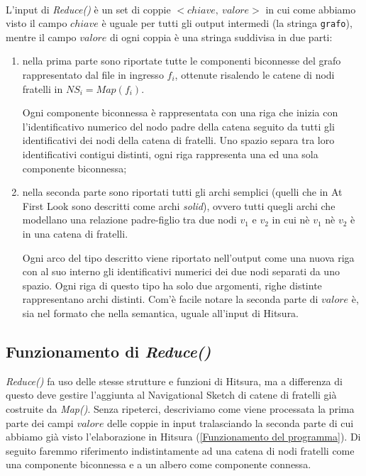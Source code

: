 \documentclass[a4paper,11pt]{report}
\begin{document}
\paragraph{}
L'input di \emph{Reduce()} è un set di coppie $<chiave,\ valore>$ in cui come abbiamo visto il campo $chiave$ è uguale per tutti gli output
intermedi (la stringa \verb|grafo|),
mentre il campo $valore$ di ogni coppia è una stringa suddivisa in due parti:
\begin{enumerate}
 \item nella prima parte sono riportate tutte le componenti biconnesse del grafo rappresentato dal file in ingresso $f_i$, ottenute
risalendo le catene di nodi fratelli in $NS_i=Map(f_i)$. 
\par Ogni componente biconnessa è rappresentata con una riga che inizia con l'identificativo numerico del nodo padre della catena seguito da
tutti gli identificativi dei nodi della catena di fratelli. Uno
spazio separa tra loro identificativi contigui distinti, ogni riga rappresenta una ed una sola componente biconnessa;
 \item nella seconda parte sono riportati tutti gli archi semplici (quelli che in At First Look sono descritti come archi \emph{solid}),
ovvero tutti quegli archi che modellano una relazione
padre-figlio tra due nodi $v_1$ e $v_2$ in cui nè $v_1$ nè $v_2$ è in una catena di fratelli.
\par Ogni arco del tipo descritto viene riportato nell'output come una nuova riga con al suo interno
gli identificativi numerici dei due nodi separati da uno spazio. Ogni riga di questo tipo ha solo due argomenti, righe distinte
rappresentano archi distinti.
Com'è facile notare la seconda parte di $valore$ è, sia nel formato che nella semantica, uguale all'input di Hitsura.
\end{enumerate}
\subsection{Funzionamento di \emph{Reduce()}}
\emph{Reduce()} fa uso delle stesse strutture e funzioni di Hitsura, ma a differenza di questo deve gestire l'aggiunta al Navigational
Sketch di catene di fratelli già costruite da \emph{Map()}.
Senza ripeterci, descriviamo come viene processata la prima parte dei campi $valore$ delle coppie in input tralasciando la seconda parte di
cui abbiamo già visto l'elaborazione in Hitsura 
(\ref{Funzionamento del programma}). Di seguito faremmo riferimento indistintamente ad una catena di nodi fratelli come una componente
biconnessa e a un albero come componente connessa.
\end{document}
